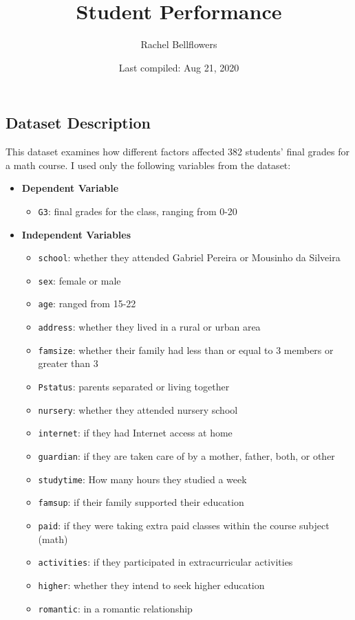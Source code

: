 \documentclass[
]{article}
\title{Student Performance}
\author{Rachel Bellflowers}
\date{Last compiled: Aug 21, 2020}
\providecommand{\tightlist}{%
  \setlength{\itemsep}{0pt}\setlength{\parskip}{0pt}}
\begin{document}
\maketitle

{
\setcounter{tocdepth}{2}
\tableofcontents
}
\hypertarget{dataset-description}{%
\subsection*{Dataset Description}\label{dataset-description}}

This dataset examines how different factors affected 382 students' final grades for a math course. I used only the following variables from the dataset:

\begin{itemize}
\tightlist
\item
  \textbf{Dependent Variable}

  \begin{itemize}
  \tightlist
  \item
    \texttt{G3}: final grades for the class, ranging from 0-20
  \end{itemize}
\item
  \textbf{Independent Variables}

  \begin{itemize}
  \tightlist
  \item
    \texttt{school}: whether they attended Gabriel Pereira or Mousinho da Silveira
  \item
    \texttt{sex}: female or male
  \item
    \texttt{age}: ranged from 15-22
  \item
    \texttt{address}: whether they lived in a rural or urban area
  \item
    \texttt{famsize}: whether their family had less than or equal to 3 members or greater than 3
  \item
    \texttt{Pstatus}: parents separated or living together
  \item
    \texttt{nursery}: whether they attended nursery school
  \item
    \texttt{internet}: if they had Internet access at home
  \item
    \texttt{guardian}: if they are taken care of by a mother, father, both, or other
  \item
    \texttt{studytime}: How many hours they studied a week
  \item
    \texttt{famsup}: if their family supported their education
  \item
    \texttt{paid}: if they were taking extra paid classes within the course subject (math)
  \item
    \texttt{activities}: if they participated in extracurricular activities
  \item
    \texttt{higher}: whether they intend to seek higher education
  \item
    \texttt{romantic}: in a romantic relationship
  \end{itemize}
\end{itemize}
\end{document}

